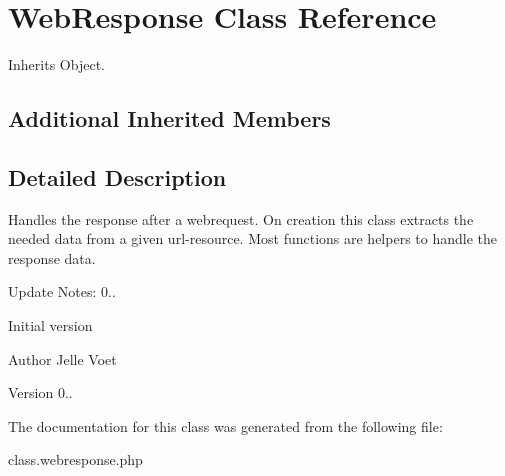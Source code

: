 \hypertarget{class_web_response}{\section{Web\-Response Class Reference}
\label{class_web_response}
}


Inherits Object.

\subsection*{Additional Inherited Members}


\subsection{Detailed Description}
Handles the response after a webrequest. On creation this class extracts the needed data from a given url-\/resource. Most functions are helpers to handle the response data.

Update Notes\-: 0..
\begin{DoxyItemize}
\item Initial version
\end{DoxyItemize}

\begin{DoxyAuthor}{Author}
Jelle Voet 
\end{DoxyAuthor}
\begin{DoxyVersion}{Version}
0.. 
\end{DoxyVersion}


The documentation for this class was generated from the following file\-:\begin{DoxyCompactItemize}
\item 
class.\-webresponse.\-php\end{DoxyCompactItemize}
